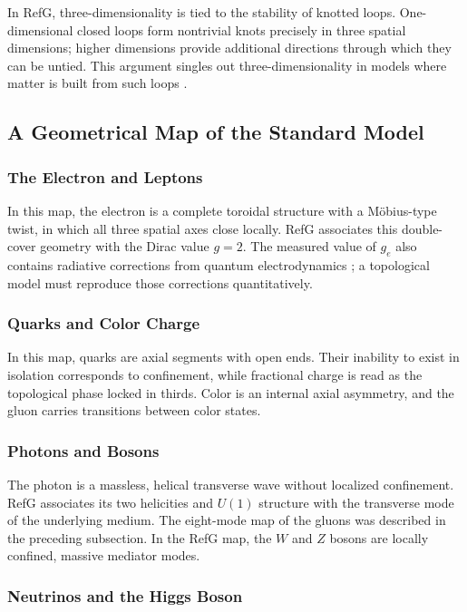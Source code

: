 \documentclass[11pt,a4paper]{article}
\begin{document}
In RefG, three-dimensionality is tied to the stability of knotted loops. One-dimensional closed loops form nontrivial knots precisely in three spatial dimensions; higher dimensions provide additional directions through which they can be untied. This argument singles out three-dimensionality in models where matter is built from such loops \citep{ehrenfest1918,whitrow1955,berera2017}.

\subsection{A Geometrical Map of the Standard Model}

\subsubsection{The Electron and Leptons}

In this map, the electron is a complete toroidal structure with a Möbius-type twist, in which all three spatial axes close locally. RefG associates this double-cover geometry with the Dirac value $g=2$. The measured value of $g_e$ also contains radiative corrections from quantum electrodynamics \citep{schwinger1948,fan2023}; a topological model must reproduce those corrections quantitatively.

\subsubsection{Quarks and Color Charge}

In this map, quarks are axial segments with open ends. Their inability to exist in isolation corresponds to confinement, while fractional charge is read as the topological phase locked in thirds. Color is an internal axial asymmetry, and the gluon carries transitions between color states.

\subsubsection{Photons and Bosons}

The photon is a massless, helical transverse wave without localized confinement. RefG associates its two helicities and $U(1)$ structure with the transverse mode of the underlying medium. The eight-mode map of the gluons was described in the preceding subsection. In the RefG map, the $W$ and $Z$ bosons are locally confined, massive mediator modes.

\subsubsection{Neutrinos and the Higgs Boson}
\end{document}
